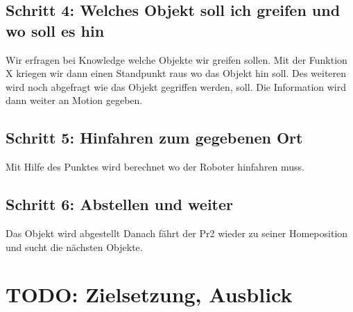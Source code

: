 \documentclass{suturo}
\begin{document}
\subsection*{Schritt 4: Welches Objekt soll ich greifen und wo soll es hin}
Wir erfragen bei Knowledge welche Objekte wir greifen sollen. %
Mit der Funktion X kriegen wir dann einen Standpunkt raus wo das Objekt hin soll. %
Des weiteren wird noch abgefragt wie das Objekt gegriffen werden, soll. Die Information wird dann weiter an Motion gegeben.

\subsection*{Schritt 5: Hinfahren zum gegebenen Ort}
Mit Hilfe des Punktes wird berechnet wo der Roboter hinfahren muss. %
 
\subsection*{Schritt 6: Abstellen und weiter}
Das Objekt wird abgestellt %
Danach fährt der Pr2 wieder zu seiner Homeposition und sucht die nächsten Objekte.


\section*{TODO: Zielsetzung, Ausblick}
\end{document}
